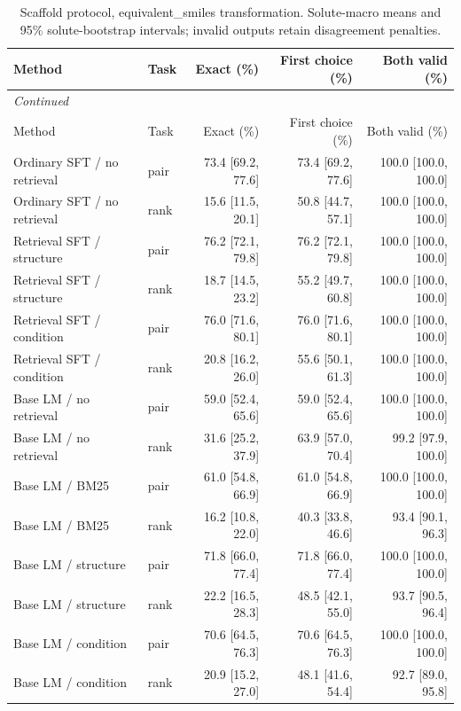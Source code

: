 \begingroup\footnotesize
\setlength{\tabcolsep}{3pt}
\begin{longtable}{p{.26\linewidth}lrrr}
\caption{Scaffold protocol, equivalent\_smiles transformation. Solute-macro means and 95\% solute-bootstrap intervals; invalid outputs retain disagreement penalties.}\label{tab:consistency-scaffold-equivalent-smiles}\\
\toprule
Method & Task & Exact (\%) & First choice (\%) & Both valid (\%) \\
\midrule
\endfirsthead
\multicolumn{5}{l}{\textit{Continued}} \\
\toprule
Method & Task & Exact (\%) & First choice (\%) & Both valid (\%) \\
\midrule
\endhead
Ordinary SFT / no retrieval & pair & 73.4 [69.2, 77.6] & 73.4 [69.2, 77.6] & 100.0 [100.0, 100.0] \\
Ordinary SFT / no retrieval & rank & 15.6 [11.5, 20.1] & 50.8 [44.7, 57.1] & 100.0 [100.0, 100.0] \\
Retrieval SFT / structure & pair & 76.2 [72.1, 79.8] & 76.2 [72.1, 79.8] & 100.0 [100.0, 100.0] \\
Retrieval SFT / structure & rank & 18.7 [14.5, 23.2] & 55.2 [49.7, 60.8] & 100.0 [100.0, 100.0] \\
Retrieval SFT / condition & pair & 76.0 [71.6, 80.1] & 76.0 [71.6, 80.1] & 100.0 [100.0, 100.0] \\
Retrieval SFT / condition & rank & 20.8 [16.2, 26.0] & 55.6 [50.1, 61.3] & 100.0 [100.0, 100.0] \\
Base LM / no retrieval & pair & 59.0 [52.4, 65.6] & 59.0 [52.4, 65.6] & 100.0 [100.0, 100.0] \\
Base LM / no retrieval & rank & 31.6 [25.2, 37.9] & 63.9 [57.0, 70.4] & 99.2 [97.9, 100.0] \\
Base LM / BM25 & pair & 61.0 [54.8, 66.9] & 61.0 [54.8, 66.9] & 100.0 [100.0, 100.0] \\
Base LM / BM25 & rank & 16.2 [10.8, 22.0] & 40.3 [33.8, 46.6] & 93.4 [90.1, 96.3] \\
Base LM / structure & pair & 71.8 [66.0, 77.4] & 71.8 [66.0, 77.4] & 100.0 [100.0, 100.0] \\
Base LM / structure & rank & 22.2 [16.5, 28.3] & 48.5 [42.1, 55.0] & 93.7 [90.5, 96.4] \\
Base LM / condition & pair & 70.6 [64.5, 76.3] & 70.6 [64.5, 76.3] & 100.0 [100.0, 100.0] \\
Base LM / condition & rank & 20.9 [15.2, 27.0] & 48.1 [41.6, 54.4] & 92.7 [89.0, 95.8] \\

\end{longtable}
